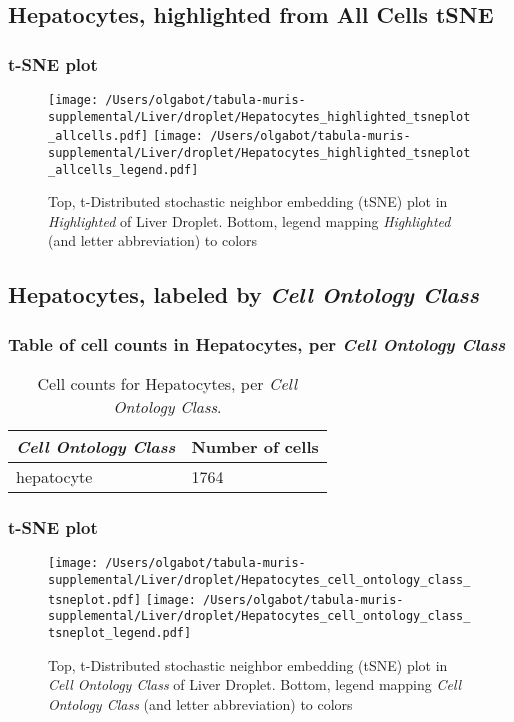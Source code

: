 \clearpage
\subsection{Hepatocytes, highlighted from All Cells tSNE}
\subsubsection{t-SNE plot}
\begin{figure}[h]
\centering
\texttt{[image: /Users/olgabot/tabula-muris-supplemental/Liver/droplet/Hepatocytes\_highlighted\_tsneplot\_allcells.pdf]}
\texttt{[image: /Users/olgabot/tabula-muris-supplemental/Liver/droplet/Hepatocytes\_highlighted\_tsneplot\_allcells\_legend.pdf]}
\caption{Top, t-Distributed stochastic neighbor embedding (tSNE) plot  in \emph{Highlighted} of Liver Droplet. Bottom, legend mapping \emph{Highlighted} (and letter abbreviation) to colors}
\end{figure}


\clearpage

\subsection{Hepatocytes, labeled by \emph{Cell Ontology Class}}
\subsubsection{Table of cell counts in Hepatocytes, per \emph{Cell Ontology Class}}\begin{table}[h]
\centering
\label{my-label}
\begin{tabular}{@{}ll@{}}
\toprule

\emph{Cell Ontology Class}& Number of cells \\ \midrule
hepatocyte & 1764 \\
\bottomrule
\end{tabular}
\caption{Cell counts for Hepatocytes, per \emph{Cell Ontology Class}.}
\end{table}

\clearpage
\subsubsection{t-SNE plot}
\begin{figure}[h]
\centering
\texttt{[image: /Users/olgabot/tabula-muris-supplemental/Liver/droplet/Hepatocytes\_cell\_ontology\_class\_tsneplot.pdf]}
\texttt{[image: /Users/olgabot/tabula-muris-supplemental/Liver/droplet/Hepatocytes\_cell\_ontology\_class\_tsneplot\_legend.pdf]}
\caption{Top, t-Distributed stochastic neighbor embedding (tSNE) plot  in \emph{Cell Ontology Class} of Liver Droplet. Bottom, legend mapping \emph{Cell Ontology Class} (and letter abbreviation) to colors}
\end{figure}



